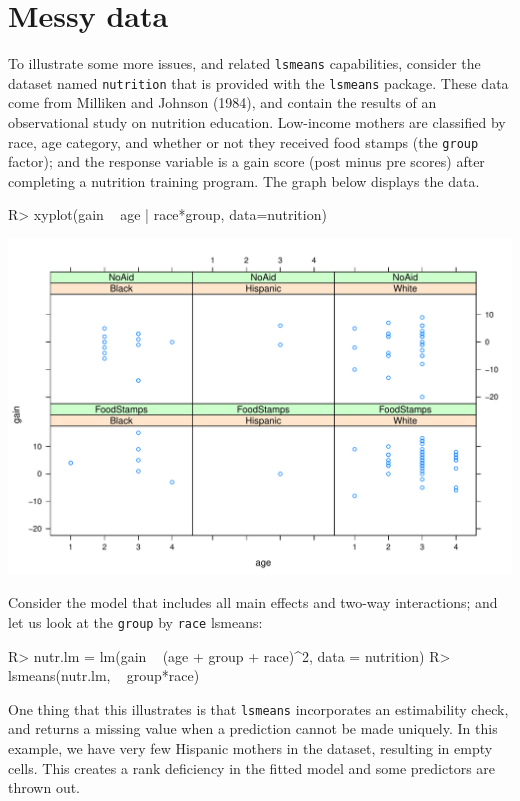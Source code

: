 \documentclass{article}
\def\code{\texttt}
\begin{document}
\section{Messy data}
To illustrate some more issues, and related \code{lsmeans} capabilities, consider the dataset named \code{nutrition} that is provided with the \code{lsmeans} package. These data come from Milliken and Johnson (1984), and contain the results of an observational study on nutrition education. Low-income mothers are classified by race, age category, and whether or not they received food stamps (the \code{group} factor); and the response variable is a gain score (post minus pre scores) after completing a nutrition training program. The graph below displays the data.
\begin{Winput}
R> xyplot(gain ~ age | race*group, data=nutrition)
\end{Winput}
\includegraphics[scale=.5]{using-lsmeans-nutr-scatter-fig.pdf}

Consider the model that includes all main effects and two-way interactions; and let us look at the \code{group} by \code{race} lsmeans:
\begin{Winput}
R> nutr.lm = lm(gain ~ (age + group + race)^2, data = nutrition)
R> lsmeans(nutr.lm, ~ group*race)
\end{Winput}
One thing that this illustrates is that \code{lsmeans} incorporates an estimability check, and returns a missing value when a prediction cannot be made uniquely. In this example, we have very few Hispanic mothers in the dataset, resulting in empty cells. This creates a rank deficiency in the fitted model and some predictors are thrown out.
\end{document}
